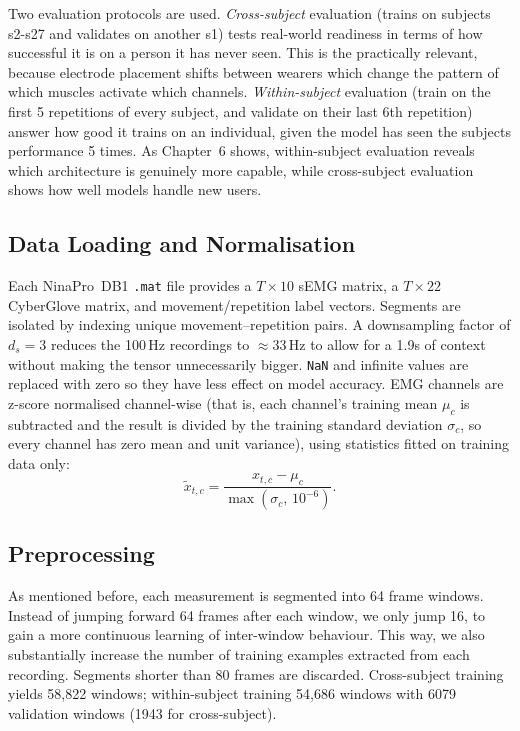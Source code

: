 \documentclass[11pt]{article}
\begin{document}
Two evaluation protocols are used. \emph{Cross-subject} evaluation (trains on subjects s2-s27 and validates on another s1) tests real-world readiness in terms of how successful it is on a person it has never seen. This is the practically relevant, because electrode placement shifts between wearers which change the pattern of which muscles activate which channels. \emph{Within-subject} evaluation (train on the first 5 repetitions of every subject, and validate on their last 6th repetition) answer how good it trains on an individual, given the model has seen the subjects performance 5 times. As Chapter~6 shows, within-subject evaluation reveals which architecture is genuinely more capable, while cross-subject evaluation shows how well models handle new users.

\subsection{Data Loading and Normalisation}

Each NinaPro~DB1 \texttt{.mat} file provides a $T \times 10$ sEMG matrix, a $T \times 22$ CyberGlove matrix, and movement/repetition label vectors. Segments are isolated by indexing unique movement--repetition pairs. A downsampling factor of $d_s=3$ reduces the 100\,Hz recordings to ${\approx}33$\,Hz to allow for a 1.9s of context without making the tensor unnecessarily bigger. \texttt{NaN} and infinite values are replaced with zero so they have less effect on model accuracy. EMG channels are z-score normalised channel-wise (that is, each channel's training mean $\mu_c$ is subtracted and the result is divided by the training standard deviation $\sigma_c$, so every channel has zero mean and unit variance), using statistics fitted on training data only:
\begin{equation}
\tilde{x}_{t,c} = \frac{x_{t,c} - \mu_c}{\max(\sigma_c,\,10^{-6})}.
\end{equation}

\subsection{Preprocessing}
As mentioned before, each measurement is segmented into 64 frame windows. Instead of jumping forward 64 frames after each window, we only jump 16, to gain a more continuous learning of inter-window behaviour. This way, we also substantially increase the number of training examples extracted from each recording. Segments shorter than 80 frames are discarded. Cross-subject training yields 58,822 windows; within-subject training 54,686 windows with 6079 validation windows (1943 for cross-subject). 
\end{document}
